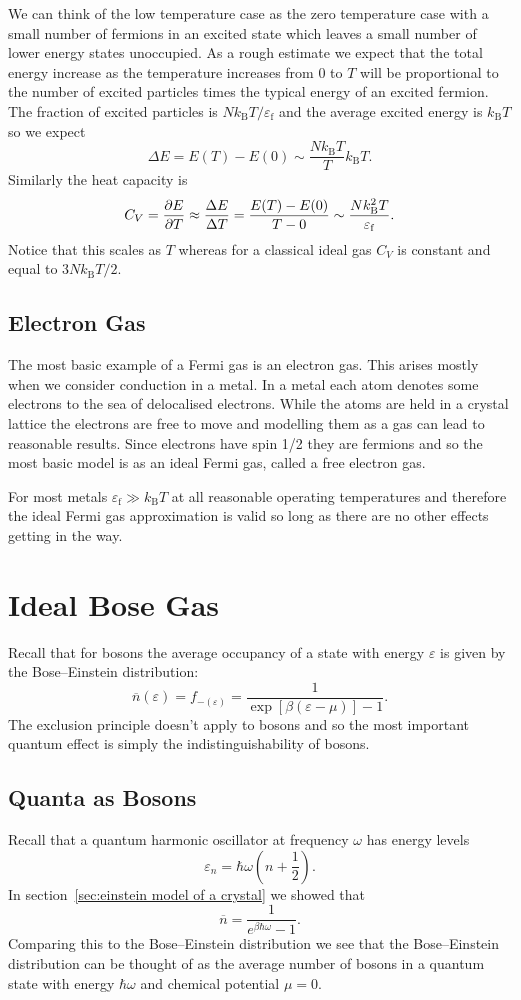 \documentclass[a4paper]{article}
\newcommand{\boltzmann}{k_\mathrm{B}}
\newcommand{\mean}[1]{\overline{#1}}
\newcommand{\fermiEnergy}{\varepsilon_{\mathrm{f}}}
\begin{document}
    We can think of the low temperature case as the zero temperature case with a small number of fermions in an excited state which leaves a small number of lower energy states unoccupied.
    As a rough estimate we expect that the total energy increase as the temperature increases from \(0\) to \(T\) will be proportional to the number of excited particles times the typical energy of an excited fermion.
    The fraction of excited particles is \(N\boltzmann T/\fermiEnergy\) and the average excited energy is \(\boltzmann T\) so we expect
    \[\Delta E = E(T) - E(0) \sim \frac{N\boltzmann T}{T}\boltzmann T.\]
    Similarly the heat capacity is
    \[C_{V} = \pdv{E}{T} \approx \frac{\Delta E}{\Delta T} = \frac{E(T) - E(0)}{T - 0} \sim \frac{N \boltzmann^2 T}{\fermiEnergy}.\]
    Notice that this scales as \(T\) whereas for a classical ideal gas \(C_V\) is constant and equal to \(3N\boltzmann T/2\).

    \subsection{Electron Gas}
    The most basic example of a Fermi gas is an electron gas.
    This arises mostly when we consider conduction in a metal.
    In a metal each atom denotes some electrons to the sea of delocalised electrons.
    While the atoms are held in a crystal lattice the electrons are free to move and modelling them as a gas can lead to reasonable results.
    Since electrons have spin 1/2 they are fermions and so the most basic model is as an ideal Fermi gas, called a free electron gas.
    
    For most metals \(\fermiEnergy \gg \boltzmann T\) at all reasonable operating temperatures and therefore the ideal Fermi gas approximation is valid so long as there are no other effects getting in the way.
    
    \section{Ideal Bose Gas}
    Recall that for bosons the average occupancy of a state with energy \(\varepsilon\) is given by the Bose--Einstein distribution:
    \[\mean{n}(\varepsilon) = f_{-(\varepsilon)} = \frac{1}{\exp[\beta(\varepsilon - \mu)] - 1}.\]
    The exclusion principle doesn't apply to bosons and so the most important quantum effect is simply the indistinguishability of bosons.
    
    \subsection{Quanta as Bosons}
    Recall that a quantum harmonic oscillator at frequency \(\omega\) has energy levels
    \[\varepsilon_n = \hbar\omega\left( n + \frac{1}{2} \right).\]
    In section~\ref{sec:einstein model of a crystal} we showed that
    \[\mean{n} = \frac{1}{e^{\beta\hbar\omega} - 1}.\]
    Comparing this to the Bose--Einstein distribution we see that the Bose--Einstein distribution can be thought of as the average number of bosons in a quantum state with energy \(\hbar\omega\) and chemical potential \(\mu = 0\).
    
\end{document}
